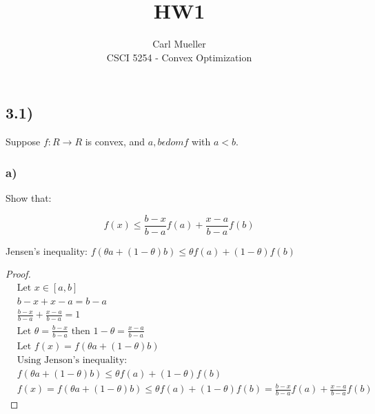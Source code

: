 \documentclass[12pt]{article}
\newenvironment{proposition}[2][Proposition]{\begin{trivlist}
\item[\hskip \labelsep {\bfseries #1}\hskip \labelsep {\bfseries #2.}]}{\end{trivlist}}
\begin{document}
 
 
 
\title{HW1}%
\author{Carl Mueller\\ %
CSCI 5254 - Convex Optimization} %
 
\maketitle

\subsection*{3.1)}
\begin{proposition}{}
Suppose $f: R \rightarrow R$ is convex, and $a, b \epsilon dom f$ with $a < b$.
\end{proposition}
\subsubsection*{a)}
Show that:

$$
f(x) \le \frac{b-x}{b-a}f(a) + \frac{x-a}{b-a}f(b)
$$

\begin{proposition}{1}
Jensen's inequality: $f(\theta a + (1 - \theta)b) \le \theta f(a) + (1 - \theta) f(b)$
\end{proposition}
\begin{proof}
\begin{align*}
& \text{Let } x \in [a,b]\\
& b-x + x-a = b-a\\
& \frac{b-x}{b-a} + \frac{x-a}{b-a} = 1\\
& \text{Let } \theta = \frac{b-x}{b-a} \text{ then } 1 - \theta = \frac{x-a}{b-a}\\
& \text{Let } f(x) = f(\theta a + (1 - \theta)b)\\
& \text{Using Jenson's inequality:}\\
& f(\theta a + (1 - \theta)b) \le \theta f(a) + (1 - \theta) f(b)\\
& f(x) = f(\theta a + (1 - \theta)b) \le \theta f(a) + (1 - \theta) f(b) = \frac{b-x}{b-a}f(a) + \frac{x-a}{b-a}f(b)
\end{align*}
\end{proof}
\end{document}
